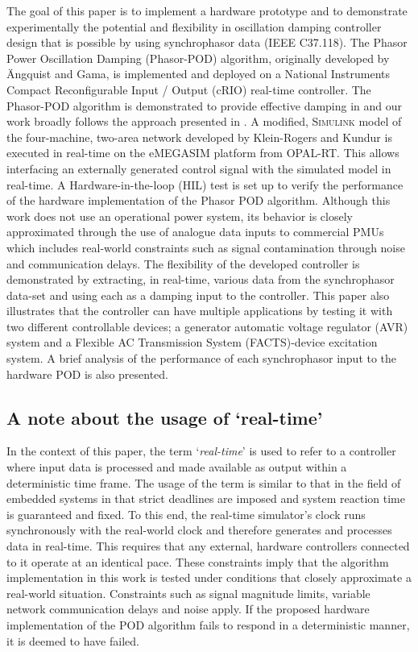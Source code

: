 \documentclass{ieeeaccess}
\begin{document}
The goal of this paper is to implement a hardware prototype and to demonstrate experimentally the potential and flexibility in oscillation damping controller design that is possible by using synchrophasor data (IEEE C37.118). The Phasor Power Oscillation Damping (Phasor-POD) algorithm, originally developed by \"{A}ngquist and Gama\cite{PhasorPOD}, is implemented and deployed on a National Instruments Compact Reconfigurable Input / Output (cRIO) real-time controller. The Phasor-POD algorithm is demonstrated to provide effective damping in \cite{PhasorPODImplement} and our work broadly follows the approach presented in \cite{PhasorPODImplement}. A modified, \textsc{Simulink} model of the four-machine, two-area network developed by Klein-Rogers and Kundur \cite{KundurTwoArea} is executed in real-time on the eMEGASIM \cite{eMEGASIM} platform from OPAL-RT. This allows interfacing an externally generated control signal with the simulated model in real-time. A Hardware-in-the-loop (HIL) test is set up to verify the performance of the hardware implementation of the Phasor POD algorithm. Although this work does not use an operational power system, its behavior is closely approximated through the use of analogue data inputs to commercial PMUs which includes real-world constraints such as signal contamination through noise and communication delays. The flexibility of the developed controller is demonstrated by extracting, in real-time, various data from the synchrophasor data-set and using each as a damping input to the controller. This paper also illustrates that the controller can have multiple applications by testing it with two different controllable devices; a generator automatic voltage regulator (AVR) system and a Flexible AC Transmission System (FACTS)-device excitation system. A brief analysis of the performance of each synchrophasor input to the hardware POD is also presented.

\subsection{A note about the usage of `real-time'}
In the context of this paper, the term `\emph{real-time}' is used to refer to a controller where input data is processed and made available as output within a deterministic time frame. The usage of the term is similar to that in the field of embedded systems in that strict deadlines are imposed and system reaction time is guaranteed and fixed. To this end, the real-time simulator's clock runs synchronously with the real-world clock and therefore generates and processes data in real-time. This requires that any external, hardware controllers connected to it operate at an identical pace. These constraints imply that the algorithm implementation in this work is tested under conditions that closely approximate a real-world situation. Constraints such as signal magnitude limits, variable network communication delays and noise apply. If the proposed hardware implementation of the POD algorithm fails to respond in a deterministic manner, it is deemed to have failed.
\end{document}
